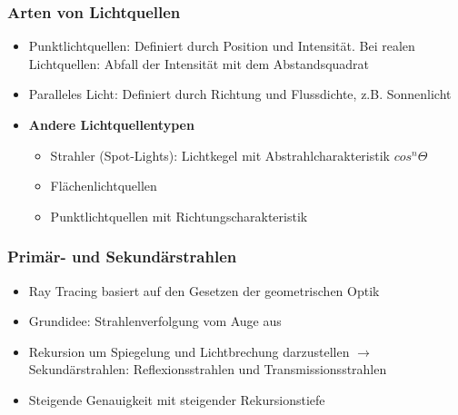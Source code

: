 \subsubsection{Arten von Lichtquellen}
\begin{itemize}
	\item Punktlichtquellen: Definiert durch Position und Intensität. Bei realen Lichtquellen: Abfall der Intensität mit dem Abstandsquadrat
	\item Paralleles Licht: Definiert durch Richtung und Flussdichte, z.B. Sonnenlicht
	\item \textbf{Andere Lichtquellentypen}
	\begin{itemize}
		\item Strahler (Spot-Lights): Lichtkegel mit Abstrahlcharakteristik \(cos^n \Theta\)
		\item Flächenlichtquellen
		\item Punktlichtquellen mit Richtungscharakteristik
	\end{itemize}
\end{itemize}

\subsubsection{Primär- und Sekundärstrahlen}
\begin{itemize}
	\item Ray Tracing basiert auf den Gesetzen der geometrischen Optik
	\item Grundidee: Strahlenverfolgung vom Auge aus
	\item Rekursion um Spiegelung und Lichtbrechung darzustellen \(\rightarrow\) Sekundärstrahlen: Reflexionsstrahlen und Transmissionsstrahlen
	\item Steigende Genauigkeit mit steigender Rekursionstiefe
\end{itemize}


